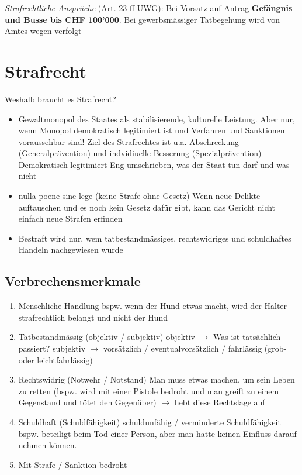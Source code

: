 \documentclass{report}
\theoremstyle{definition}
\theoremstyle{example}
\begin{document}
\textit{Strafrechtliche Ansprüche} (Art. 23 ff UWG): Bei Vorsatz auf Antrag \textbf{Gefängnis und Busse bis CHF 100'000}. Bei gewerbsmässiger Tatbegehung wird von Amtes wegen verfolgt

\chapter{Strafrecht}

Weshalb braucht es Strafrecht?
\begin{itemize}
   \item Gewaltmonopol des Staates als stabilisierende, kulturelle Leistung. Aber nur, wenn Monopol demokratisch legitimiert ist und Verfahren und Sanktionen voraussehbar sind! Ziel des Strafrechtes ist u.a. Abschreckung (Generalprävention) und indvidiuelle Besserung (Spezialprävention)
   \subitem Demokratisch legitimiert
   \subitem Eng umschrieben, was der Staat tun darf und was nicht 
   \item nulla poene sine lege (keine Strafe ohne Gesetz)
   \subitem Wenn neue Delikte auftauschen und es noch kein Gesetz dafür gibt, kann das Gericht nicht einfach neue Strafen erfinden 
   \item Bestraft wird nur, wem tatbestandmässiges, rechtswidriges und schuldhaftes Handeln nachgewiesen wurde
\end{itemize}

\section{Verbrechensmerkmale}
\begin{enumerate}
   \item Menschliche Handlung
   \subitem bspw. wenn der Hund etwas macht, wird der Halter strafrechtlich belangt und nicht der Hund 
   \item Tatbestandmässig (objektiv / subjektiv)
   \subitem objektiv $\rightarrow$ Was ist tatsächlich passiert?
   \subitem subjektiv $\rightarrow$ vorsätzlich / eventualvorsätzlich / fahrlässig (grob- oder leichtfahrlässig)
   \item Rechtswidrig (Notwehr / Notstand)
   \subitem Man muss etwas machen, um sein Leben zu retten (bspw. wird mit einer Pistole bedroht und man greift zu einem Gegenstand und tötet den Gegenüber) $\rightarrow$ hebt diese Rechtslage auf 
   \item Schuldhaft (Schuldfähigkeit)
   \subitem schuldunfähig / verminderte Schuldfähigkeit 
   \subitem bspw. beteiligt beim Tod einer Person, aber man hatte keinen Einfluss darauf nehmen können.
   \item Mit Strafe / Sanktion bedroht
\end{enumerate}
\end{document}
